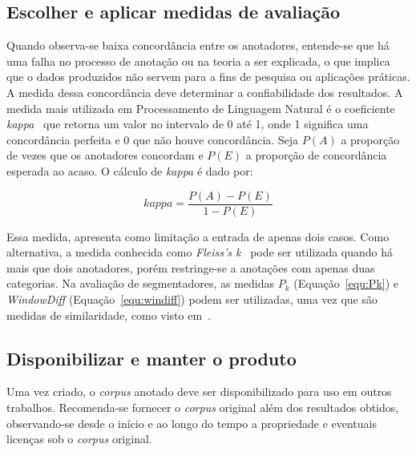 \subsection*{Escolher e aplicar medidas de avaliação}

Quando observa-se baixa concordância entre os anotadores, entende-se que há uma falha no processo de anotação ou na teoria a ser explicada, o que implica que o dados produzidos não servem para a fins de pesquisa ou aplicações práticas. A medida dessa concordância deve determinar a confiabilidade dos resultados.
A medida mais utilizada em Processamento de Linguagem Natural é o coeficiente \textit{kappa}~\cite{Carletta1996} que retorna um valor no intervalo de 0 até 1, onde 1 significa uma concordância perfeita e 0 que não houve concordância. Seja $P(A)$ a proporção de vezes que os anotadores concordam e $P(E)$ a proporção de concordância esperada ao acaso. O cálculo de \textit{kappa} é dado por:

\begin{equation}
	kappa = \frac{P(A) - P(E)}{1 - P(E)}
\end{equation}

Essa medida, apresenta como limitação a entrada de apenas dois casos. Como alternativa, a medida conhecida como \textit{Fleiss's k}~\cite{Fleiss1979} pode ser utilizada quando há mais que dois anotadores, porém restringe-se a anotações com apenas duas categorias. 
Na avaliação de segmentadores, as medidas $P_k$ (Equação~\ref{equ:Pk}) e \textit{WindowDiff} (Equação~\ref{equ:windiff}) podem ser utilizadas, uma vez que são medidas de similaridade, como visto em~\cite{Kazantseva2012,Cardoso2017}.



\subsection*{Disponibilizar e manter o produto}

Uma vez criado, o \textit{corpus} anotado deve ser disponibilizado para uso em outros trabalhos. 
Recomenda-se fornecer o \textit{corpus} original além dos resultados obtidos, observando-se desde o início e ao longo do tempo a propriedade e eventuais licenças sob o \textit{corpus} original.




